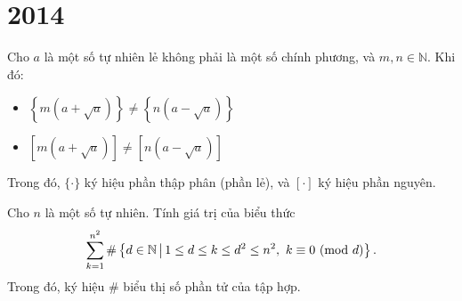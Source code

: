 \documentclass[./m.tex]{subfiles}
\begin{document}
\section{2014}

\begin{problem}\label{problem:ROU-2014-MO-G9-P2}
    Cho \( a \) là một số tự nhiên lẻ không phải là một số chính phương, và \( m, n \in \mathbb{N} \). Khi đó:
    \begin{itemize}[topsep=0pt, partopsep=0pt, itemsep=0pt]
        \item \( \left\{ m\left( a+\sqrt{a} \right) \right\} \neq \left\{ n\left( a-\sqrt{a} \right) \right\} \)
        \item \( \left[ m\left( a+\sqrt{a} \right) \right] \neq \left[ n\left( a-\sqrt{a} \right) \right] \)
    \end{itemize}
    Trong đó, \( \{\cdot\} \) ký hiệu phần thập phân (phần lẻ), và \( [\cdot] \) ký hiệu phần nguyên.
\end{problem}

\begin{problem}\label{problem:ROU-2014-MO-G10-P1}
    Cho \( n \) là một số tự nhiên. Tính giá trị của biểu thức
    \[
        \sum_{k=1}^{n^2} \#\left\{ d \in \mathbb{N} \,\middle|\, 1 \le d \le k \le d^2 \le n^2,\ k \equiv 0 \ (\mathrm{mod}\ d) \right\}.
    \]
    Trong đó, ký hiệu \( \# \) biểu thị số phần tử của tập hợp.
\end{problem}
\end{document}
